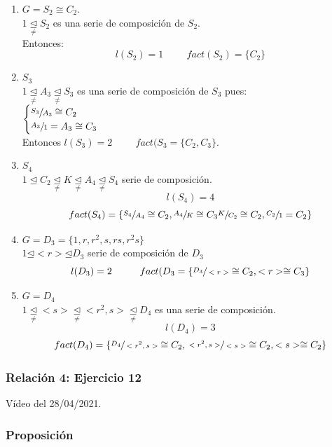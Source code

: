 \documentclass[11pt,a4paper]{article}
\begin{document}
\begin{enumerate}
\item $G = S_{2} \cong C_{2}$. \\
$1 \underset{\neq}{\unlhd} S_{2}$ es una serie de composición de $S_{2}$. \\
Entonces:
$$l(S_{2}) = 1 \hspace{1cm} fact(S_{2}) = \{C_{2}\}$$
\item $S_{3}$ \\
$1 \underset{\neq}{\unlhd} A_{3} \underset{\neq}{\unlhd} S_{3}$ es una serie de composición de $S_{3}$ pues: \\
$\begin{cases}
\sfrac{S_{3}}{A_{3}} \cong C_{2} \\
\sfrac{A_{3}}{1} = A_{3} \cong C_{3}
\end{cases}$ \\
Entonces $l(S_{3}) = 2 \hspace{1cm} fact(S_{3} = \{C_{2}, C_{3}\}$.
\item $S_{4}$ \\
$1 \unlhd C_{2} \underset{\neq}{\unlhd} K \underset{\neq}{\unlhd} A_{4} \underset{\neq}{\unlhd} S_{4}$ serie de composición.
$$l(S_{4}) = 4$$ $$fact(S_{4}) = \{\sfrac{S_{4}}{A_{4}} \cong C_{2}, \sfrac{A_{4}}{K} \cong C_{3} \sfrac{K}{C_{2}} \cong C_{2}, \sfrac{C_{2}}{1} = C_{2}\}$$
\item $G = D_{3} = \{1, r, r^{2}, s, rs, r^{2}s\}$ \\
$1 \unlhd <r> \unlhd D_{3}$ serie de composición de $D_{3}$
$$l(D_{3}) = 2 \hspace{1cm} fact(D_{3} = \{\sfrac{D_{3}}{<r>} \cong C_{2}, <r> \cong C_{3}\}$$
\item $G = D_{4}$ \\
$1 \underset{\neq}{\unlhd} <s> \underset{\neq}{\unlhd} <r^{2},s> \underset{\neq}{\unlhd} D_{4}$ es una serie de composición.
$$l(D_{4}) = 3$$
$$fact(D_{4}) = \{\sfrac{D_{4}}{<r^{2},s>} \cong C_{2}, \sfrac{<r^{2},s>}{<s>} \cong C_{2}, <s> \cong C_{2}\}$$
\end{enumerate}

\subsubsection*{Relación 4: Ejercicio 12}

Vídeo del 28/04/2021.


\subsubsection*{Proposición}
\end{document}
